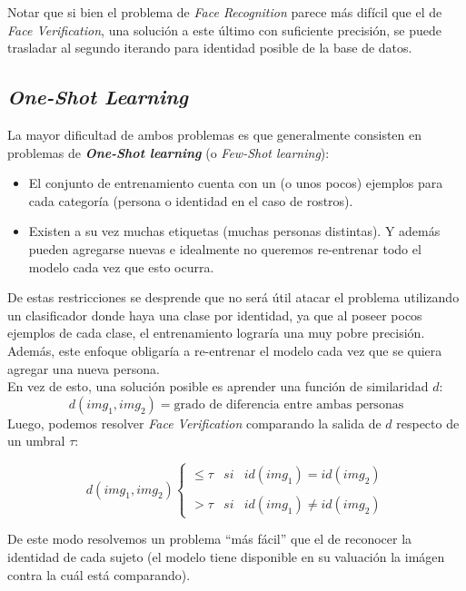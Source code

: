 Notar que si bien el problema de \textit{Face Recognition} parece más difícil que el de \textit{Face Verification}, una solución a este último con suficiente precisión, se puede trasladar al segundo iterando para identidad posible de la base de datos.

\subsection{\textit{One-Shot Learning}} \label{subsection:one-shot}

La mayor dificultad de ambos problemas es que generalmente consisten en problemas de \textbf{\textit{One-Shot learning}} (o \textit{Few-Shot learning}):
\begin{itemize}
    \item El conjunto de entrenamiento cuenta con un (o unos pocos) ejemplos para cada categoría (persona o identidad en el caso de rostros).
    \item Existen a su vez muchas etiquetas (muchas personas distintas). Y además pueden agregarse nuevas e idealmente no queremos re-entrenar todo el modelo cada vez que esto ocurra.
\end{itemize}
De estas restricciones se desprende que no será útil atacar el problema utilizando un clasificador donde haya una clase por identidad, ya que al poseer pocos ejemplos de cada clase, el entrenamiento lograría una muy pobre precisión. Además, este enfoque obligaría a re-entrenar el modelo cada vez que se quiera agregar una nueva persona. \\
En vez de esto, una solución posible es aprender una función de similaridad $d$:
\begin{equation*}
    d(img_1, img_2) = \text{grado de diferencia entre ambas personas}
\end{equation*}
Luego, podemos resolver \textit{Face Verification} comparando la salida de $d$ respecto de un umbral $\tau$: 

\begin{equation*}
    d(img_1, img_2) \left\{ \begin{array}{lcc}
             \leq \tau &   si  & id(img_1) = id(img_2) \\
             \\ > \tau &   si  & id(img_1) \neq id(img_2) 
             \end{array}
   \right.
\end{equation*}

De este modo resolvemos un problema ``más fácil'' que el de reconocer la identidad de cada sujeto (el modelo tiene disponible en su valuación la imágen contra la cuál está comparando). 

